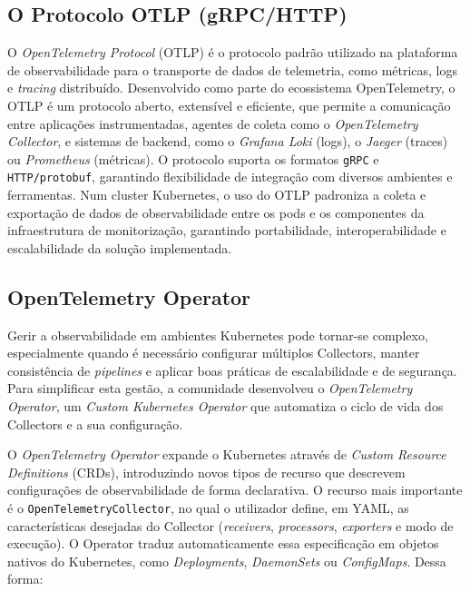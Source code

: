 \subsection{O Protocolo OTLP (gRPC/HTTP)}

O \textit{OpenTelemetry Protocol} (OTLP) é o protocolo padrão utilizado na plataforma de observabilidade para o transporte de dados de telemetria, como métricas, logs e \textit{tracing} distribuído. Desenvolvido como parte do ecossistema OpenTelemetry, o OTLP é um protocolo aberto, extensível e eficiente, que permite a comunicação entre aplicações instrumentadas, agentes de coleta como o \textit{OpenTelemetry Collector}, e sistemas de backend, como o \textit{Grafana Loki} (logs), o \textit{Jaeger} (traces) ou \textit{Prometheus} (métricas). O protocolo suporta os formatos \texttt{gRPC} e \texttt{HTTP/protobuf}, garantindo flexibilidade de integração com diversos ambientes e ferramentas. Num cluster Kubernetes, o uso do OTLP padroniza a coleta e exportação de dados de observabilidade entre os pods e os componentes da infraestrutura de monitorização, garantindo portabilidade, interoperabilidade e escalabilidade da solução implementada.

\subsection{OpenTelemetry Operator}

Gerir a observabilidade em ambientes Kubernetes pode tornar-se complexo, especialmente quando é necessário configurar múltiplos Collectors, manter consistência de \textit{pipelines} e aplicar boas práticas de escalabilidade e de segurança. Para simplificar esta gestão, a comunidade desenvolveu o \textit{OpenTelemetry Operator}, um \textit{Custom Kubernetes Operator} que automatiza o ciclo de vida dos Collectors e a sua configuração.

O \textit{OpenTelemetry Operator} expande o Kubernetes através de \textit{Custom Resource Definitions} (CRDs), introduzindo novos tipos de recurso que descrevem configurações de observabilidade de forma declarativa. O recurso mais importante é o \texttt{OpenTelemetryCollector}, no qual o utilizador define, em YAML, as características desejadas do Collector (\textit{receivers}, \textit{processors}, \textit{exporters} e modo de execução). O Operator traduz automaticamente essa especificação em objetos nativos do Kubernetes, como \textit{Deployments}, \textit{DaemonSets} ou \textit{ConfigMaps}. Dessa forma:

